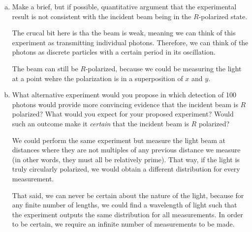 \documentclass[10pt]{article}
\begin{document}
    \begin{enumerate}[(a)]
        \item Make a brief, but if possible, quantitative argument that the experimental result is not consistent with the incident beam being in the $R$-polarized state. 
        
        \begin{solution}
            The crucal bit here is tha the beam is weak, meaning we can think of this experiment as transmitting individual photons. Therefore, we can think of the photons as discrete particles with a certain period in its oscillation.
            
            The beam can still be $R$-polarized, because we could be measuring the light at a point wehre the polarization is in a superposition of $x$ and $y$.
        \end{solution}
        \item What alternative experiment would you propose in which detection of 100 photons would provide more convincing evidence that the incident beam is $R$ polarized? What would you expect for your proposed experiment? Would such an outcome make it \textit{certain} that the incident beam is $R$ polarized?
        
        \begin{solution}
            We could perform the same experiment but measure the light beam at distances where they are not multiples of any previous distance we measure (in other words, they must all be relatively prime). That way, if the light is truly circularly polarized, we would obtain a different distribution for every measurement. 

            That said, we can never be certain about the nature of the light, because for any finite number of lengths, we could find a wavelength of light such that the experiment outputs the same distribution for all measurements. In order to be certain, we require an infinite number of measurements to be made.
        \end{solution}
    \end{enumerate}
\end{document}
